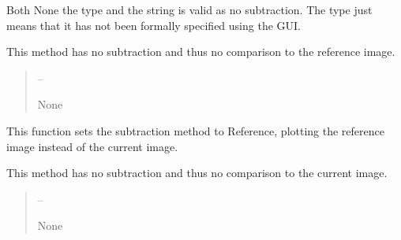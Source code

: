 \documentclass[letterpaper,11pt,english]{sphinxmanual}
\begin{document}
\begin{savenotes}
\begin{fulllineitems}
\begin{savenotes}
\begin{fulllineitems}
\sphinxAtStartPar
Both None the type and the string is valid as no subtraction. The
type just means that it has not been formally specified using the GUI.

\sphinxAtStartPar
This method has no subtraction and thus no comparison to the reference
image.
\begin{quote}\begin{description}
\sphinxAtStartPar
{} – 

\sphinxAtStartPar
None

\end{description}\end{quote}

\end{fulllineitems}\end{savenotes}


\begin{savenotes}\begin{fulllineitems}
\label{\detokenize{code/opihiexarata.gui.selector:opihiexarata.gui.selector.TargetSelectorWindow.__connect_push_button_mode_reference}}
\pysigstartsignatures
{}
\pysigstopsignatures
\sphinxAtStartPar
This function sets the subtraction method to Reference, plotting
the reference image instead of the current image.

\sphinxAtStartPar
This method has no subtraction and thus no comparison to the current
image.
\begin{quote}\begin{description}
\sphinxAtStartPar
{} – 

\sphinxAtStartPar
None

\end{description}\end{quote}

\end{fulllineitems}\end{savenotes}



\end{fulllineitems}
\end{savenotes}
\end{document}
